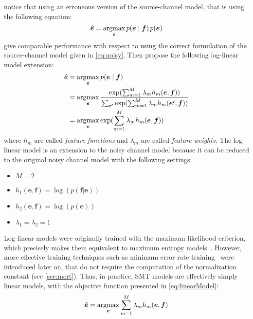 
\citet{och-tillmann-ney:1999:EMNLP} notice that using an erroneous
version of the source-channel model, that is using the following equation:
%
\begin{equation}
  \bm{\hat{e}} = \operatorname*{argmax}_{\bm{e}} p(\bm{e} \mid \bm{f}) \, p(\bm{e})
\end{equation}
%
give comparable performance with respect to using the correct
formulation of the source-channel model given in \autoref{eq:noisy}.
Then \citet{och-ney:2002:ACL} propose the following log-linear model extension:
%
\begin{align}
  \bm{\hat{e}} &= \operatorname*{argmax}_{\bm{e}} p(\bm{e} \mid \bm{f}) \nonumber \\
               &= \operatorname*{argmax}_{\bm{e}} \frac{\exp(\sum_{m=1}^M \lambda_m h_m(\bm{e}, \bm{f}))}{\sum_{\bm{e'}}\exp(\sum_{m=1}^M \lambda_m h_m(\bm{e'}, \bm{f}))} \nonumber \\
               &= \operatorname*{argmax}_{\bm{e}} \exp(\sum_{m=1}^M \lambda_m h_m(\bm{e}, \bm{f})) \label{eq:loglinearModel}
\end{align}
%
where $h_m$ are called \emph{feature functions} and $\lambda_m$
are called \emph{feature weights}. The log-linear model is an extension
to the noisy channel model because it can be reduced to the original
noisy channel model with the following settings:
%
    \begin{itemize}
      \item $M = 2$
      \item $h_1(\bm{e}, \bm{f}) = \log (p(\bm{f}|\bm{e}))$
      \item $h_2(\bm{e}, \bm{f}) = \log (p(\bm{e}))$
      \item $\lambda_1 = \lambda_2 = 1$
    \end{itemize}
%
Log-linear models were originally trained with the maximum likelihood
criterion, which precisely makes them equivalent to maximum entropy
models~\citep{berger-dellapietra-dellapietra:1996:CL}. However,
more effective training techniques such as minimum error rate
training~\citep{och:2003:ACL} were introduced later on, that do
not require the computation of the normalization constant
(see \autoref{sec:mert}).
Thus, in practice, SMT models are effectively simply linear models, with the objective
function presented in \autoref{eq:linearModel}:
%
\begin{equation}
  \bm{\hat{e}} = \operatorname*{argmax}_{\bm{e}} \sum_{m=1}^M \lambda_m h_m(\bm{e}, \bm{f})
  \label{eq:linearModel}
\end{equation}

